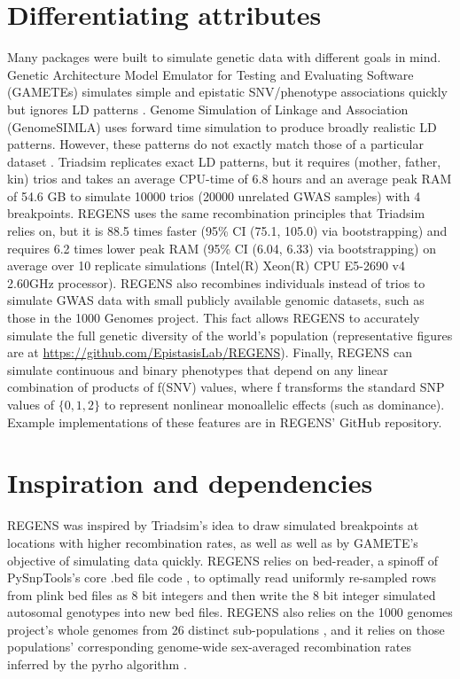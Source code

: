 \documentclass[11pt]{article}
\begin{document}
\begin{singlespace}
\section{Differentiating attributes}

Many packages were built to simulate genetic data with different goals in mind. Genetic Architecture Model Emulator for Testing and Evaluating Software (GAMETEs) simulates simple and epistatic SNV/phenotype associations quickly but ignores LD patterns \cite{source:6}. Genome Simulation of Linkage and Association (GenomeSIMLA) uses forward time simulation to produce broadly realistic LD patterns. However, these patterns do not exactly match those of a particular dataset \cite{source:7}. Triadsim \cite{source:1} replicates exact LD patterns, but it requires (mother, father, kin) trios and takes an average CPU-time of 6.8 hours and an average peak RAM of 54.6 GB to simulate 10000 trios (20000 unrelated GWAS samples) with 4 breakpoints. REGENS uses the same recombination principles that Triadsim relies on, but it is 88.5 times faster (95\% CI (75.1, 105.0) via bootstrapping) and requires 6.2 times lower peak RAM (95\% CI (6.04, 6.33) via bootstrapping) on average over 10 replicate simulations (Intel(R) Xeon(R) CPU E5-2690 v4 2.60GHz processor). REGENS also recombines individuals instead of trios to simulate GWAS data with small publicly available genomic datasets, such as those in the 1000 Genomes project. This fact allows REGENS to accurately simulate the full genetic diversity of the world's population (representative figures are at \url{https://github.com/EpistasisLab/REGENS}). Finally, REGENS can simulate continuous and binary phenotypes that depend on any linear combination of products of f(SNV) values, where f transforms the standard SNP values of $\{0,1,2\}$ to represent nonlinear monoallelic effects (such as dominance). Example implementations of these features are in REGENS' GitHub repository.\\

\section{Inspiration and dependencies}

REGENS was inspired by Triadsim's idea to draw simulated breakpoints at locations with higher recombination rates, as well as well as by GAMETE's objective of simulating data quickly. REGENS relies on bed-reader, a spinoff of PySnpTools's core .bed file code \cite{source:8}, to optimally read uniformly re-sampled rows from plink bed files as 8 bit integers and then write the 8 bit integer simulated autosomal genotypes into new bed files. REGENS also relies on the 1000 genomes project's whole genomes from 26 distinct sub-populations \cite{source:9}, and it relies on those populations' corresponding genome-wide sex-averaged recombination rates inferred by the pyrho algorithm \cite{source:10}.\\  


\end{singlespace}
\end{document}

